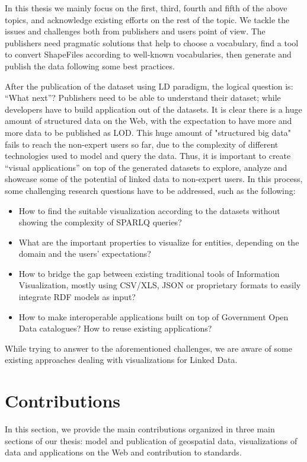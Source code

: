 In this thesis we mainly focus on the first, third, fourth and fifth of the above topics, and acknowledge existing efforts on the rest of the topic. We tackle the issues and challenges both from publishers and users point of view. The publishers need pragmatic solutions that help to choose a vocabulary, find a tool to convert ShapeFiles according to well-known vocabularies, then generate and publish the data following some best practices.


After the publication of the dataset using LD paradigm, the logical question is: ``What next''? Publishers need to be able to understand their dataset; while developers have to build application out of the datasets. It is clear there is a huge amount of structured data on the Web, with the expectation to have more and more 
data to be published as LOD. This huge amount of "structured big data" fails to reach the non-expert users 
so far, due to the complexity of different technologies used to model and query the data. Thus, it is 
important to create ``visual applications'' on top of the generated datasets to explore, analyze and showcase 
some of the potential of linked data to non-expert users. In this process, some challenging research questions have to be addressed, such as the following:

\begin{itemize}
\item  How to find the suitable visualization according to the datasets without showing the complexity of SPARLQ queries?
 \item  What are the important properties to visualize for entities, depending on the domain and the users' expectations?
 \item  How to bridge the gap between existing traditional tools of Information Visualization, mostly using CSV/XLS, JSON or proprietary formats to easily integrate RDF models as input?
 \item How to make interoperable applications built on top of Government Open Data catalogues? How to reuse existing applications?
\end{itemize}
 
 While trying to answer to the aforementioned challenges, we are aware of some existing approaches dealing with visualizations for Linked Data. 


\section{Contributions}
\label{sec:contributions}
In this section, we provide the main contributions organized in three main sections of our thesis: model and publication of geospatial data, visualizations of data and applications on the Web and contribution to standards. 

